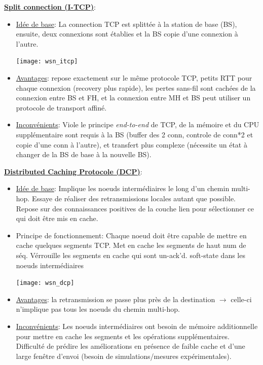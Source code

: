 \documentclass{article}
\begin{document}
\begin{sffamily}
\underline{\bf Split connection (I-TCP)}:
\begin{itemize}
\item \underline{Idée de base}:
  La connection TCP est splittée à la station de base (BS),
  ensuite, deux connexions sont établies et la BS copie d'une
  connexion à l'autre.

  \texttt{[image: wsn\_itcp]}
\item \underline{Avantages}:
  repose exactement sur le même protocole TCP,
  petits RTT pour chaque connexion (recovery plus rapide),
  les pertes sans-fil sont cachées de la connexion entre BS et FH,
  et la connexion entre MH et BS peut utiliser un protocole de transport
  affiné.
\item \underline{Inconvénients}:
  Viole le principe \textit{end-to-end} de TCP,
  de la mémoire et du CPU supplémentaire sont requis à la BS (buffer des 2 conn,
  controle de conn*2 et copie d'une conn à l'autre),
  et transfert plus complexe (nécessite un état à changer de la BS de base à
  la nouvelle BS).
\end{itemize}

\underline{\bf Distributed Caching Protocole (DCP)}:
\begin{itemize}
\item \underline{Idée de base}:
  Implique les noeuds intermédiaires le long d'un chemin
  multi-hop. Essaye de réaliser des retransmissions locales autant que possible.
  Repose sur des connaissances positives de la couche lien pour sélectionner
  ce qui doit être mis en cache.
\item Principe de fonctionnement:
  Chaque noeud doit être capable de mettre en cache quelques segments TCP.
  Met en cache les segments de haut num de séq.
  Vérrouille les segments en cache qui sont un-ack'd.
  soft-state dans les noeuds intermédiaires

  \texttt{[image: wsn\_dcp]}
\item \underline{Avantages}:
  la retransmission se passe plus près de la destination $\rightarrow$
  celle-ci n'implique pas tous les noeuds du chemin multi-hop.
\item \underline{Inconvénients}:
  Les noeuds intermédiaires ont besoin de mémoire additionnelle pour
  mettre en cache les segments et les opérations supplémentaires.
  Difficulté de prédire les améliorations en présence de faible cache et
  d'une large fenêtre d'envoi (besoin de simulations/mesures expérimentales).
\end{itemize}


\end{sffamily}
\end{document}
